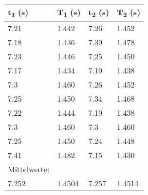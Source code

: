 \documentclass[titlepage=firstcover, captions=tableheading]{scrartcl}
\begin{document}
\begin{minipage}{\linewidth}
    \centering
    \begin{tabular}{llll}
        \toprule
        t\textsubscript{1} (s) & T\textsubscript{1} (s) & t\textsubscript{2} (s) & T\textsubscript{2} (s) \\
        \midrule
        7.21 & 1.442 & 7.26 & 1.452\\
        7.18 & 1.436 & 7.39 & 1.478\\
        7.23 & 1.446 & 7.25 & 1.450\\
        7.17 & 1.434 & 7.19 & 1.438\\
        7.3  & 1.460 & 7.26 & 1.452\\
        7.25 & 1.450 & 7.34 & 1.468\\
        7.22 & 1.444 & 7.19 & 1.438\\
        7.3  & 1.460 & 7.3  & 1.460\\
        7.25 & 1.450 & 7.24 & 1.448\\
        7.41 & 1.482 & 7.15 & 1.430\\
        \midrule
        Mittelwerte:\\
        7.252 & 1.4504 & 7.257 & 1.4514  \\
        \bottomrule
        
    \end{tabular}
\end{minipage}
\leavevmode
\newline
\vspace*{1 cm}
\newline
\end{document}

